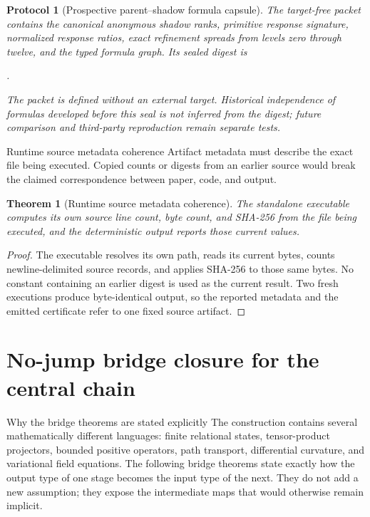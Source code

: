 \documentclass[11pt]{article}
\numberwithin{equation}{section}
\newtheorem{theorem}[definition]{Theorem}
\newtheorem{protocol}[definition]{Protocol}
\theoremstyle{remark}
\begin{document}
\begin{protocol}[Prospective parent--shadow formula capsule]
The target-free packet contains the canonical anonymous shadow ranks, primitive response signature, normalized response ratios, exact refinement spreads from levels zero through twelve, and the typed formula graph. Its sealed digest is
\begin{center}
.
\end{center}
The packet is defined without an external target. Historical independence of formulas developed before this seal is not inferred from the digest; future comparison and third-party reproduction remain separate tests.
\end{protocol}


\begin{proofguide}{Runtime source metadata coherence}
Artifact metadata must describe the exact file being executed. Copied counts or digests from an earlier source would break the claimed correspondence between paper, code, and output.
\end{proofguide}
\begin{theorem}[Runtime source metadata coherence]
The standalone executable computes its own source line count, byte count, and SHA-256 from the file being executed, and the deterministic output reports those current values.
\end{theorem}
\begin{proof}
The executable resolves its own path, reads its current bytes, counts newline-delimited source records, and applies SHA-256 to those same bytes. No constant containing an earlier digest is used as the current result. Two fresh executions produce byte-identical output, so the reported metadata and the emitted certificate refer to one fixed source artifact.
\end{proof}


\section{No-jump bridge closure for the central chain}
\label{sec:bridges}
\begin{proofguide}{Why the bridge theorems are stated explicitly}
The construction contains several mathematically different languages: finite relational states, tensor-product projectors, bounded positive operators, path transport, differential curvature, and variational field equations. The following bridge theorems state exactly how the output type of one stage becomes the input type of the next. They do not add a new assumption; they expose the intermediate maps that would otherwise remain implicit.
\end{proofguide}
\end{document}

